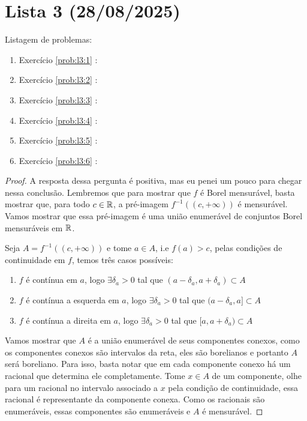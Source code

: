 \section{Lista 3 (28/08/2025)}

Listagem de problemas:
\begin{enumerate}
    \item Exercício \ref{prob:l3:1} : \checkmark
    \item Exercício \ref{prob:l3:2} : \checkmark
    \item Exercício \ref{prob:l3:3} : \checkmark
    \item Exercício \ref{prob:l3:4} : \checkmark
    \item Exercício \ref{prob:l3:5} : \checkmark
    \item Exercício \ref{prob:l3:6} : \checkmark
\end{enumerate}

\begin{problem}
    \label{prob:l3:1}
\end{problem}
\begin{proof}
    A resposta dessa pergunta é positiva, mas eu penei um pouco para chegar nessa conclusão. Lembremos 
    que para mostrar que $f$ é Borel mensurável, basta mostrar que, para todo $c \in \mathbb{R}$, a pré-imagem 
    $f^{-1}((c, +\infty))$ é mensurável. Vamos mostrar que essa pré-imagem é uma união enumerável de conjuntos
    Borel mensuráveis em $\mathbb{R}$.

    Seja $A = f^{-1}((c, +\infty))$ e tome $a \in A$, i.e $f(a) > c$, pelas condições de continuidade em $f$, temos três casos possíveis:
    \begin{enumerate}
        \item $f$ é contínua em $a$, logo $\exists \delta_a > 0$ tal que $(a - \delta_a, a + \delta_a) \subset A$
        \item $f$ é contínua a esquerda em $a$, logo $\exists \delta_a > 0$ tal que $(a - \delta_a, a] \subset A$
        \item $f$ é contínua a direita em $a$, logo $\exists \delta_a > 0$ tal que $[a, a + \delta_a) \subset A$
    \end{enumerate}
    Vamos mostrar que $A$ é a união enumerável de seus componentes conexos, como os componentes conexos são intervalos
    da reta, eles são borelianos e portanto $A$ será boreliano. Para isso, basta notar que em cada componente conexo 
    há um racional que determina ele completamente. Tome $x \in A$ de um componente, olhe para 
    um racional no intervalo associado a $x$ pela condição 
    de continuidade, essa racional é representante da componente conexa. 
    Como os racionais são enumeráveis, essas componentes são enumeráveis e $A$ é mensurável.
\end{proof}


